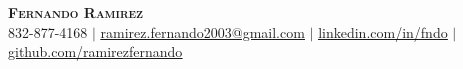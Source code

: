 \begin{center}
	\textbf{\Huge \scshape Fernando Ramirez} \\ \vspace{1pt}
	\small 832-877-4168 $|$
    \href{mailto:ramirez.fernando2003@gmail.com}{\underline{ramirez.fernando2003@gmail.com}} $|$
	\href{https://www.linkedin.com/in/fndo/}{\underline{linkedin.com/in/fndo}} $|$
	\href{https://github.com/ramirezfernando}{\underline{github.com/ramirezfernando}}
\end{center}